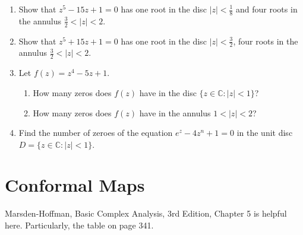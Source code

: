 \documentclass[a4paper,10pt]{article}
\begin{document}
\begin{enumerate}
	\item Show that $z^{5}-15z+1=0$ has one root in the disc $|z|<\frac{1}{8}$ and four roots in the annulus $\frac{3}{2}<|z|<2$.
	
	\item Show that $z^{5}+15z+1=0$ has one root in the disc $|z|<\frac{3}{2}$, four roots in the annulus $\frac{3}{2}<|z|<2$.
	
	\item Let $f(z)=z^{4}-5z+1$.
	\begin{enumerate}
		\item How many zeros does $f(z)$ have in the disc $\{z\in \mathbb{C}:|z|<1\}$?
		\item How many zeros does $f(z)$ have in the annulus $1<|z|<2$?
	\end{enumerate}
	
	\item Find the number of zeroes of the equation $e^{z}-4z^{n}+1=0$ in the unit disc $D=\{z\in \mathbb{C}:|z|<1\}$.
	
\end{enumerate}


\section{Conformal Maps}
Marsden-Hoffman, Basic Complex Analysis, 3rd Edition, Chapter 5 is helpful here. 
Particularly, the table on page 341.
\end{document}
